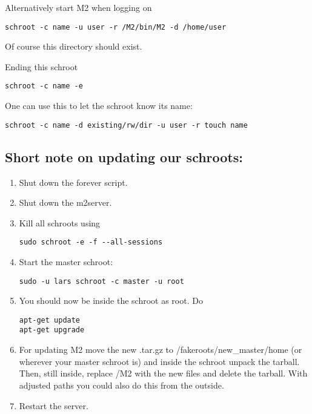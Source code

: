 \documentclass[a4paper]{book}
\begin{document}
Alternatively start M2 when logging on

\begin{verbatim}
schroot -c name -u user -r /M2/bin/M2 -d /home/user 
\end{verbatim}

Of course this directory should exist.

Ending this schroot
\begin{verbatim}
schroot -c name -e
\end{verbatim}

One can use this to let the schroot know its name:

\begin{verbatim}
schroot -c name -d existing/rw/dir -u user -r touch name
\end{verbatim}

\subsection{Short note on updating our schroots:}
\begin{enumerate}
\item Shut down the forever script.
\item Shut down the m2server.
\item Kill all schroots using
\begin{verbatim}
sudo schroot -e -f --all-sessions
\end{verbatim}
\item Start the master schroot:
\begin{verbatim}
sudo -u lars schroot -c master -u root
\end{verbatim}
\item You should now be inside the schroot as root. Do
\begin{verbatim}
apt-get update
apt-get upgrade
\end{verbatim}
\item For updating M2 move the new .tar.gz to /fakeroots/new\_master/home (or wherever your master schroot is) and inside the schroot unpack the tarball. Then, still inside, replace /M2 with the new files and delete the tarball. With adjusted paths you could also do this from the outside.
\item Restart the server.
\end{enumerate}
\end{document}
